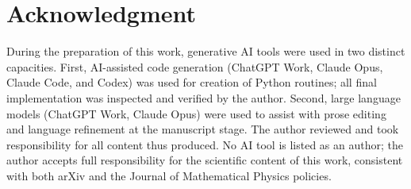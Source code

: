 \documentclass[11pt]{article}
\theoremstyle{remark}
\begin{document}
\clearpage
\section*{Acknowledgment}

During the preparation of this work, generative AI tools were used
in two distinct capacities. First, AI-assisted code generation
(ChatGPT Work, Claude Opus, Claude Code, and Codex) was used for creation
of Python routines; all final implementation was inspected and verified
by the author. Second, large language models (ChatGPT Work, Claude Opus)
were used to assist with prose editing and language refinement at the
manuscript stage. The author reviewed and took responsibility for all
content thus produced. No AI tool is listed as an author; the author
accepts full responsibility for the scientific content of this work,
consistent with both arXiv and the Journal of Mathematical Physics
policies.



\end{document}
